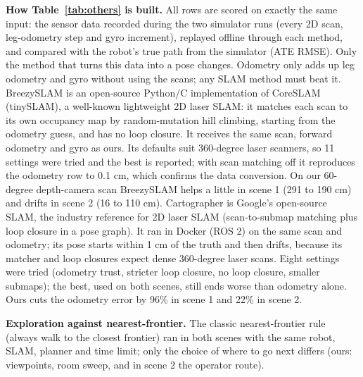 \documentclass[11pt, a4paper]{article}
\begin{document}
\noindent
\textbf{How Table~\ref{tab:others} is built.} All rows are scored on exactly the same input: the sensor data recorded during the two simulator runs (every 2D scan, leg-odometry step and gyro increment), replayed offline through each method, and compared with the robot's true path from the simulator (ATE RMSE). Only the method that turns this data into a pose changes. Odometry only adds up leg odometry and gyro without using the scans; any SLAM method must beat it. BreezySLAM \cite{steux2010} is an open-source Python/C implementation of CoreSLAM (tinySLAM), a well-known lightweight 2D laser SLAM: it matches each scan to its own occupancy map by random-mutation hill climbing, starting from the odometry guess, and has no loop closure. It receives the same scan, forward odometry and gyro as ours. Its defaults suit 360-degree laser scanners, so 11 settings were tried and the best is reported; with scan matching off it reproduces the odometry row to 0.1 cm, which confirms the data conversion. On our 60-degree depth-camera scan BreezySLAM helps a little in scene 1 (291 to 190 cm) and drifts in scene 2 (16 to 110 cm). Cartographer \cite{hess2016} is Google's open-source SLAM, the industry reference for 2D laser SLAM (scan-to-submap matching plus loop closure in a pose graph). It ran in Docker (ROS 2) on the same scan and odometry; its pose starts within 1 cm of the truth and then drifts, because its matcher and loop closures expect dense 360-degree laser scans. Eight settings were tried (odometry trust, stricter loop closure, no loop closure, smaller submaps); the best, used on both scenes, still ends worse than odometry alone. Ours cuts the odometry error by 96\% in scene 1 and 22\% in scene 2.

\noindent
\textbf{Exploration against nearest-frontier.} The classic nearest-frontier rule \cite{yamauchi1997} (always walk to the closest frontier) ran in both scenes with the same robot, SLAM, planner and time limit; only the choice of where to go next differs (ours: viewpoints, room sweep, and in scene 2 the operator route).
\end{document}
